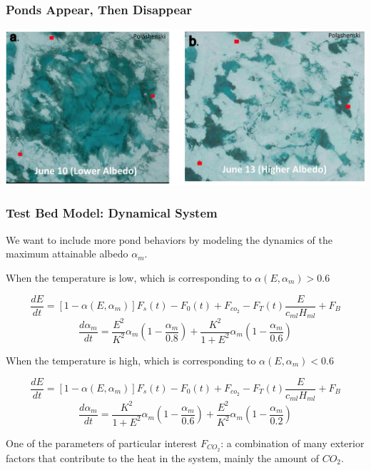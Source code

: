 \documentclass{beamer}
\begin{document}
\begin{frame}
\frametitle{Ponds Appear, Then Disappear}
\centering
\includegraphics[width=\linewidth]{Figures/PondsDisappear.jpg}
\end{frame}

\begin{frame}
\frametitle{Test Bed Model: Dynamical System}
\scriptsize{
We want to include more pond behaviors by modeling the dynamics of the maximum attainable albedo $\alpha_m$.
}
{\setlength{\parskip}{0.5em}
\begin{itemize}
\scriptsize{
\item When the temperature is low, which is corresponding to $\alpha(E,\alpha_m)>0.6$
}
\[\frac{dE}{dt}=[1-\alpha(E,\alpha_{m})]F_s(t)-F_0(t)+F_{co_2}-F_T(t)\frac{E}{c_{ml} H_{ml}}+F_B\]
\[\frac{d \alpha_{m}}{dt}= \frac{E^2}{K^2}\alpha_{m}\left(1-\frac{\alpha_{m}}{0.8}\right) + \frac{K^2}{1+E^2}\alpha_{m}\left(1-\frac{\alpha_{m}}{0.6}\right) \]
\scriptsize{
\item When the temperature is high, which is corresponding to $\alpha(E,\alpha_m)<0.6$
}
\[\frac{dE}{dt}=[1-\alpha(E,\alpha_{m})]F_s(t)-F_0(t)+F_{co_2}-F_T(t)\frac{E}{c_{ml} H_{ml}}+F_B \]
\[\frac{ d \alpha_{m}}{dt}=\frac{K^2}{1+E^2}\alpha_{m}\left(1-\frac{\alpha_{m}}{0.6}\right) +\frac{E^2}{K^2}\alpha_{m}\left(1-\frac{\alpha_{m}}{0.2}\right) \]
\scriptsize{
\item One of the parameters of particular interest $F_{CO_2}$: a combination of many exterior factors that contribute to the heat in the system, mainly the amount of $CO_2$.
}
\end{itemize}
}
\end{frame}
\end{document}
